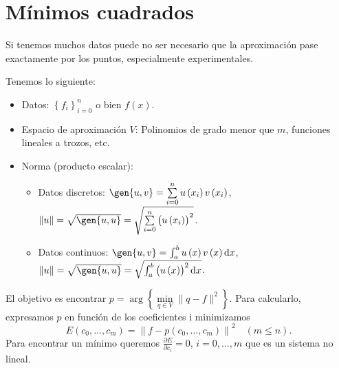 \section{Mínimos cuadrados}
\begin{obs}
    Si tenemos muchos datos puede no ser necesario que la aproximación pase exactamente por los puntos, especialmente experimentales.
\end{obs}
Tenemos lo siguiente:
\begin{itemize}
    \item Datos: $\left\{ f_i \right\}_{i=0}^n$ o bien $f(x)$.
    \item Espacio de aproximación $V$: Polinomios de grado menor que $m$, funciones lineales a trozos, etc.
    \item Norma (producto escalar):
        \begin{itemize}
            \item Datos discretos: $\gen{u, v} = \sum\limits_{i=0}^n u\left( x_i \right) v\left( x_i \right)$, $\|u\| = \sqrt{\gen{u, u}} = \sqrt{\sum\limits_{i=0}^n\left( u\left( x_i \right) \right)^2}$.
            \item Datos continuos: $\gen{u, v} = \int_a^b u\left( x \right) v\left( x \right) \dif x$, $\|u\|=\sqrt{\gen{u, u}} = \sqrt{\int_a^b\left( u\left( x \right) \right)^2 \dif x}$.
        \end{itemize}
\end{itemize}
El objetivo es encontrar $p = \arg\left\{ \min\limits_{q\in V} \|q-f\|^2 \right\}$. Para calcularlo, expresamos $p$ en función de los coeficientes i minimizamos
\[
    E\left( c_0, \dots, c_m \right) = \left\|f - p\left( c_0, \dots, c_m \right)\right\|^2\quad (m\leq n).
\]
Para encontrar un mínimo queremos $\frac{\partial E}{\partial c_i} = 0$, $i = 0,\dots, m$ que es un sistema no lineal.

